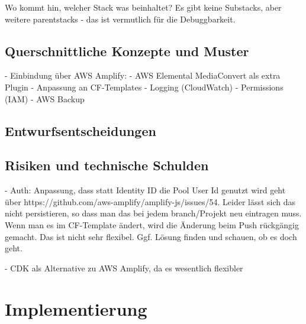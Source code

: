Wo kommt hin, welcher Stack was beinhaltet?
Es gibt keine Substacks, aber weitere parentstacks - das ist vermutlich für die Debuggbarkeit.

\subsection{Querschnittliche Konzepte und Muster}

- Einbindung über \ac{AWS} Amplify:
  - AWS Elemental MediaConvert als extra Plugin
  - Anpassung an CF-Templates
- Logging (CloudWatch)
- Permissions (IAM)
- AWS Backup

\subsection{Entwurfsentscheidungen}

\subsection{Risiken und technische Schulden}

- Auth: Anpassung, dass statt Identity ID die Pool User Id genutzt wird geht über https://github.com/aws-amplify/amplify-js/issues/54. Leider lässt sich das nicht persistieren, so dass man das bei jedem branch/Projekt neu eintragen muss. Wenn man es im CF-Template ändert, wird die Änderung beim Push rückgängig gemacht. Das ist nicht sehr flexibel. Ggf. Lösung finden und schauen, ob es doch geht.

- CDK als Alternative zu AWS Amplify, da es wesentlich flexibler

\section{Implementierung}